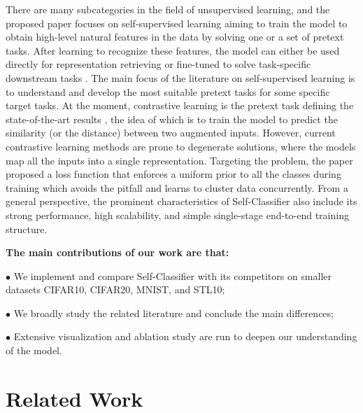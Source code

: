 \documentclass{article}
\begin{document}
There are many subcategories in the field of unsupervised learning, and the proposed paper\cite{self_classifier} focuses on self-supervised learning aiming to train the model to obtain high-level natural features in the data by solving one or a set of pretext tasks.
After learning to recognize these features, the model can either be used directly for representation retrieving or fine-tuned to solve task-specific downstream tasks \cite{self_classifier}\cite{swav} \cite{simsiam}\cite{byol}. 
The main focus of the literature on self-supervised learning is to understand and develop the most suitable pretext tasks for some specific target tasks. At the moment, contrastive learning is the pretext task defining the state-of-the-art results \cite{byol}\cite{simclr}, the idea of which is to train the model to predict the similarity (or the distance) between two augmented inputs. 
However, current contrastive learning methods are prone to degenerate solutions, where the models map all the inputs into a single representation. 
Targeting the problem, the paper proposed a loss function that enforces a uniform prior to all the classes during training which avoids the pitfall and learns to cluster data concurrently. From a general perspective, the prominent characteristics of Self-Classifier also include its strong performance, high scalability, and simple single-stage end-to-end training structure. 

\textbf{The main contributions of our work are that:}

$\bullet$  We implement and compare Self-Classifier with its competitors on smaller datasets CIFAR10, CIFAR20, MNIST, and STL10;

$\bullet$  We broadly study the related literature and conclude the main differences;

$\bullet$ Extensive visualization and ablation study are run to deepen our understanding of the model.

\section{Related Work}
\label{sec:related_work}
\end{document}
